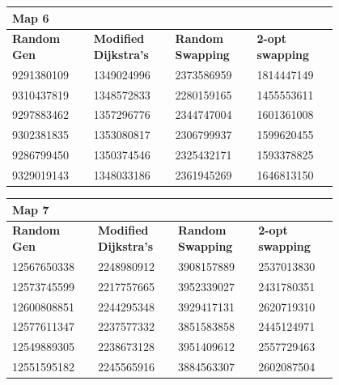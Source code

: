 \documentclass{article}
\begin{document}
\begin{table}[H]
    \centering
    \begin{tabular}{|p{0.2\linewidth}|p{0.2\linewidth}|p{0.2\linewidth}|p{0.2\linewidth}|}
    \hline
        \textbf{Map 6} & ~ & ~ & ~ \\ \hline
        \textbf{Random Gen} & \textbf{Modified Dijkstra's} & \textbf{Random Swapping} & \textbf{2-opt swapping} \\ \hline
        9291380109 & 1349024996 & 2373586959 & 1814447149 \\ \hline
        9310437819 & 1348572833 & 2280159165 & 1455553611 \\ \hline
        9297883462 & 1357296776 & 2344747004 & 1601361008 \\ \hline
        9302381835 & 1353080817 & 2306799937 & 1599620455 \\ \hline
        9286799450 & 1350374546 & 2325432171 & 1593378825 \\ \hline
        9329019143 & 1348033186 & 2361945269 & 1646813150 \\ \hline
    \end{tabular}
\end{table}

\begin{table}[H]
    \centering
    \begin{tabular}{|p{0.2\linewidth}|p{0.2\linewidth}|p{0.2\linewidth}|p{0.2\linewidth}|}
    \hline
        \textbf{Map 7} & ~ & ~ & ~ \\ \hline
        \textbf{Random Gen} & \textbf{Modified Dijkstra's} & \textbf{Random Swapping} & \textbf{2-opt swapping} \\ \hline
        12567650338 & 2248980912 & 3908157889 & 2537013830 \\ \hline
        12573745599 & 2217757665 & 3952339027 & 2431780351 \\ \hline
        12600808851 & 2244295348 & 3929417131 & 2620719310 \\ \hline
        12577611347 & 2237577332 & 3851583858 & 2445124971 \\ \hline
        12549889305 & 2238673128 & 3951409612 & 2557729463 \\ \hline
        12551595182 & 2245565916 & 3884563307 & 2602087504 \\ \hline
    \end{tabular}
\end{table}
\end{document}
